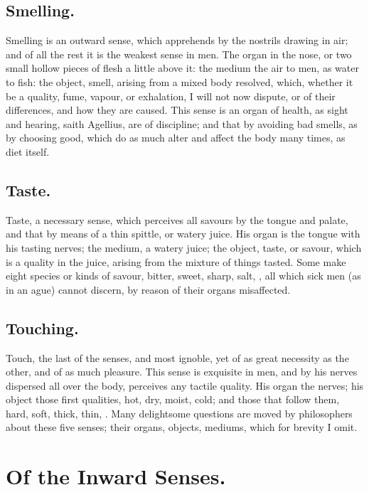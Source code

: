 {\subsection{Smelling.}
Smelling is an outward sense, which apprehends by the
nostrils drawing in air; and of all the rest it is the weakest sense in
men. The organ in the nose, or two small hollow pieces of flesh a
little above it: the medium the air to men, as water to fish: the
object, smell, arising from a mixed body resolved, which, whether it be
a quality, fume, vapour, or exhalation, I will not now dispute, or of
their differences, and how they are caused. This sense is an organ of
health, as sight and hearing, saith Agellius, are of discipline;
and that by avoiding bad smells, as by choosing good, which do as much
alter and affect the body many times, as diet itself.
\subsection{Taste.}
Taste, a necessary sense, which perceives all savours by the
tongue and palate, and that by means of a thin spittle, or watery
juice. His organ is the tongue with his tasting nerves; the medium, a
watery juice; the object, taste, or savour, which is a quality in the
juice, arising from the mixture of things tasted. Some make eight
species or kinds of savour, bitter, sweet, sharp, salt, \etc{}, all which
sick men (as in an ague) cannot discern, by reason of their organs
misaffected.
\subsection{Touching.}
Touch, the last of the senses, and most ignoble, yet of as
great necessity as the other, and of as much pleasure. This sense is
exquisite in men, and by his nerves dispersed all over the body,
perceives any tactile quality. His organ the nerves; his object those
first qualities, hot, dry, moist, cold; and those that follow them,
hard, soft, thick, thin, \etc{}. Many delightsome questions are moved by
philosophers about these five senses; their organs, objects, mediums,
which for brevity I omit.

\section{Of the Inward Senses.}

}
